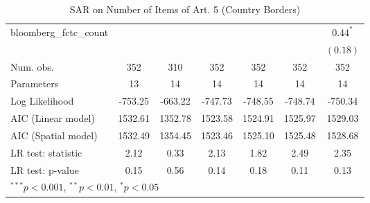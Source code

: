 \begin{table}[!h]
\begin{center}
\begin{tabular}{l c c c c c c }
bloomberg\_fctc\_count  &              &              &              &              &              & $0.44^{*}$   \\
                        &              &              &              &              &              & $(0.18)$     \\
\midrule
Num. obs.               & 352          & 310          & 352          & 352          & 352          & 352          \\
Parameters              & 13           & 14           & 14           & 14           & 14           & 14           \\
Log Likelihood          & -753.25      & -663.22      & -747.73      & -748.55      & -748.74      & -750.34      \\
AIC (Linear model)      & 1532.61      & 1352.78      & 1523.58      & 1524.91      & 1525.97      & 1529.03      \\
AIC (Spatial model)     & 1532.49      & 1354.45      & 1523.46      & 1525.10      & 1525.48      & 1528.68      \\
LR test: statistic      & 2.12         & 0.33         & 2.13         & 1.82         & 2.49         & 2.35         \\
LR test: p-value        & 0.15         & 0.56         & 0.14         & 0.18         & 0.11         & 0.13         \\
\bottomrule
\multicolumn{7}{l}{\scriptsize{$^{***}p<0.001$, $^{**}p<0.01$, $^*p<0.05$}}
\end{tabular}
\caption{SAR on Number of Items of Art. 5 (Country Borders)}
\label{table:coefficients}
\end{center}
\end{table}
